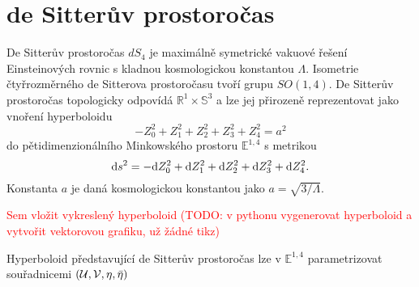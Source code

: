\section{de Sitterův prostoročas}

De Sitterův prostoročas $dS_4$ je maximálně symetrické vakuové řešení Einsteinových rovnic s kladnou kosmologickou
konstantou $\Lambda$. Isometrie čtyřrozměrného de Sitterova prostoročasu tvoří grupu $SO(1,4)$. De Sitterův prostoročas topologicky odpovídá
$\mathbb{R}^1 \times \mathbb{S}^3$ a lze jej přirozeně reprezentovat jako vnoření hyperboloidu
\begin{equation}
     \label{eq:dS_hyperboloid}
     - Z_0^2 + Z_1^2 + Z_2^2 + Z_3^2 + Z_4^2 = a^2
\end{equation}
do pětidimenzionálního Minkowského prostoru $\mathbb{E}^{1,4}$ s metrikou
\begin{equation}
     \label{eq:5d_minkowski}
     \mathrm{d} s^2 = - \mathrm{d} Z_0^2 + \mathrm{d} Z_1^2 + \mathrm{d} Z_2^2 + \mathrm{d} Z_3^2 + \mathrm{d} Z_4^2.
\end{equation}
Konstanta $a$ je daná kosmologickou konstantou jako $a = \sqrt{3/\Lambda}$.

\textcolor{red}{Sem vložit vykreslený hyperboloid (TODO: v pythonu vygenerovat hyperboloid a vytvořit vektorovou grafiku, už žádné tikz)}

Hyperboloid představující de Sitterův prostoročas lze v $\mathbb{E}^{1,4}$ parametrizovat souřadnicemi $(\mathcal{U}, \mathcal{V}, \eta, \bar{\eta})$

